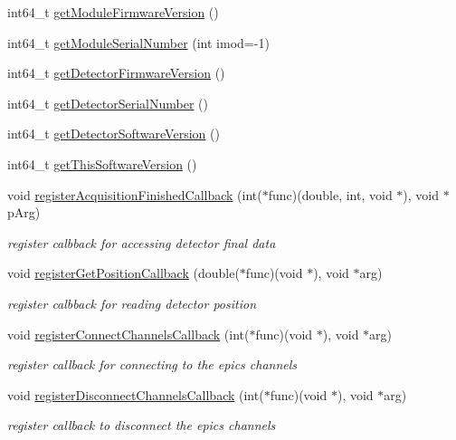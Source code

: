 \begin{CompactItemize}
int64\_\-t \hyperlink{classslsDetectorUsers_09ded3b9c81e4544d42bb0697c3b7624}{get\-Module\-Firmware\-Version} ()
\item 
int64\_\-t \hyperlink{classslsDetectorUsers_5c0e9f8836e1a8a2d986408e4f5dfd3b}{get\-Module\-Serial\-Number} (int imod=-1)
\item 
int64\_\-t \hyperlink{classslsDetectorUsers_2cbba4518b585064f7870ae2d39a8b8b}{get\-Detector\-Firmware\-Version} ()
\item 
int64\_\-t \hyperlink{classslsDetectorUsers_1c79314ceeda9b3085ca118e25882669}{get\-Detector\-Serial\-Number} ()
\item 
int64\_\-t \hyperlink{classslsDetectorUsers_1857f2afea58227cb96ad92f5e562a5e}{get\-Detector\-Software\-Version} ()
\item 
int64\_\-t \hyperlink{classslsDetectorUsers_547feb09262a2f0fa1ec4de82e92ab63}{get\-This\-Software\-Version} ()
\item 
void \hyperlink{classslsDetectorUsers_2a85e28ff08e3ec1e08bea3ba7d0fb08}{register\-Acquisition\-Finished\-Callback} (int($\ast$func)(double, int, void $\ast$), void $\ast$p\-Arg)
\begin{CompactList}\small\item\em register calbback for accessing detector final data \item\end{CompactList}\item 
void \hyperlink{classslsDetectorUsers_c2b87416288e657a209e1374c778eb16}{register\-Get\-Position\-Callback} (double($\ast$func)(void $\ast$), void $\ast$arg)
\begin{CompactList}\small\item\em register calbback for reading detector position \item\end{CompactList}\item 
void \hyperlink{classslsDetectorUsers_d1ab73675435879c2c5cef7adab02c32}{register\-Connect\-Channels\-Callback} (int($\ast$func)(void $\ast$), void $\ast$arg)
\begin{CompactList}\small\item\em register callback for connecting to the epics channels \item\end{CompactList}\item 
void \hyperlink{classslsDetectorUsers_a94dd8fce8548ba8e79201ec50fe27d6}{register\-Disconnect\-Channels\-Callback} (int($\ast$func)(void $\ast$), void $\ast$arg)
\begin{CompactList}\small\item\em register callback to disconnect the epics channels \item\end{CompactList}\item 

\end{CompactItemize}
